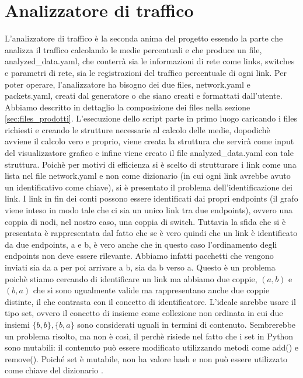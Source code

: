 \documentclass[binding=0.6cm]{sapthesis}
\begin{document}
\chapter{Analizzatore di traffico}
L'analizzatore di traffico è la seconda anima del progetto essendo la parte che analizza il traffico calcolando le medie percentuali e che produce
un file, analyzed\_data.yaml, che conterrà sia le informazioni di rete come links, switches e parametri di rete, sia le registrazioni del traffico percentuale
di ogni link. Per poter operare, l'analizzatore ha bisogno dei due files, network.yaml e packets.yaml, creati dal generatore o che siano
creati e formattati dall'utente. Abbiamo descritto in dettaglio la composizione dei files nella sezione \ref{sec:files_prodotti}.
L'esecuzione dello script parte in primo luogo caricando i files richiesti e creando le strutture necessarie al calcolo delle medie, dopodichè
avviene il calcolo vero e proprio, viene creata la struttura che servirà come input del visualizzatore grafico e infine viene creato il file
analyzed\_data.yaml con tale struttura.
Poichè per motivi di efficienza si è scelto di strutturare i link come una lista nel file network.yaml e non come dizionario (in cui ogni link avrebbe avuto un identificativo come chiave), si è presentato il problema dell'identificazione dei link.
I link in fin dei conti possono essere identificati dai propri endpoints (il grafo viene inteso in modo tale che ci sia un unico link tra due endpoints), ovvero una coppia di nodi,
nel nostro caso, una coppia di switch. Tuttavia la sfida che si è presentata è rappresentata dal fatto che se è vero quindi che un link è identificato
da due endpoints, a e b, è vero anche che in questo caso l'ordinamento degli endpoints non deve essere rilevante. Abbiamo infatti pacchetti
che vengono inviati sia da a per poi arrivare a b, sia da b verso a. Questo è un problema poichè stiamo cercando di identificare un link ma abbiamo
due coppie, \((a, b)\) e \((b, a)\) che sì sono ugualmente valide ma rappresentano anche due coppie distinte, il che contrasta con il concetto di identificatore. 
L'ideale sarebbe usare il tipo set, ovvero il concetto di insieme 
come collezione non ordinata in cui due insiemi \(\{b, b\}, \{b, a\}\) sono considerati uguali in termini di contenuto. Sembrerebbe un problema risolto, ma non è così, il perchè risiede
nel fatto che i set in Python sono mutabili: il contenuto può essere modificato utilizzando metodi come add() e remove(). 
Poiché set è mutabile, non ha valore hash \cite{pythonGlossaryHashable} e non può essere utilizzato come chiave del dizionario \cite{pythonStdTypesMapping}.
\end{document}
